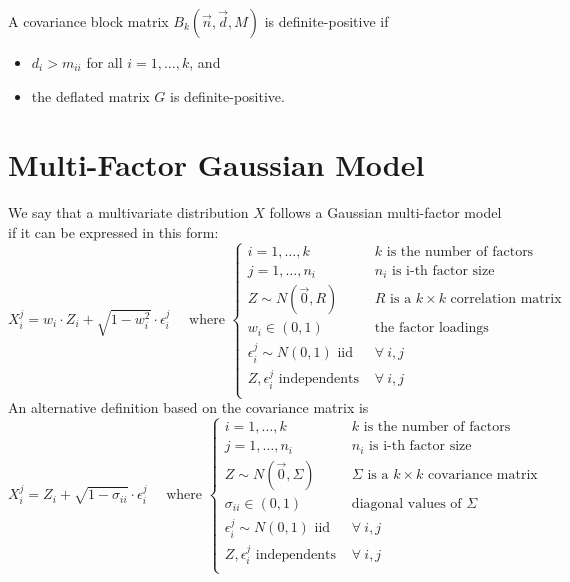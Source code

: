 \documentclass[11pt,fleqn]{book} %
\begin{document}
\begin{corollary}
	A covariance block matrix $B_k(\vec{n},\vec{d},M)$ is definite-positive if
	\begin{itemize}
		\item $d_i > m_{ii}$ for all $i=1,\dots,k$, and
		\item the deflated matrix $G$ is definite-positive.
	\end{itemize}
\end{corollary}

\section{Multi-Factor Gaussian Model}
\label{ap:mfgm}

\begin{definition}
	\label{def:gmfm}
	We say that a multivariate distribution $X$ follows a Gaussian multi-factor
	model if it can be expressed in this form:
	\begin{displaymath}
		X_i^j = w_i \cdot Z_i + \sqrt{1-w_i^2} \cdot \epsilon_i^j
		\quad \text{ where } \left\{
		\begin{array}{ll}
			i = 1, \dots, k & \text{$k$ is the number of factors} \\
			j = 1, \dots, n_i & \text{$n_i$ is i-th factor size} \\
			Z \sim N(\vec{0},R) & \text{$R$ is a $k {\times} k$ correlation matrix} \\
			w_i \in (0,1) & \text{the factor loadings } \\
			\epsilon_i^j \sim N(0,1) \text { iid } & \forall\ i,j \\
			Z, \epsilon_i^j \text{ independents } & \forall\ i,j \\
		\end{array}
		\right.
	\end{displaymath}
	An alternative definition based on the covariance matrix is
	\begin{displaymath}
		X_i^j = Z_i + \sqrt{1-\sigma_{ii}} \cdot \epsilon_i^j
		\quad \text{ where } \left\{
		\begin{array}{ll}
			i = 1, \dots, k & \text{$k$ is the number of factors} \\
			j = 1, \dots, n_i & \text{$n_i$ is i-th factor size} \\
			Z \sim N(\vec{0},\Sigma) & \text{$\Sigma$ is a $k {\times} k$ covariance matrix} \\
			\sigma_{ii} \in (0,1) & \text{diagonal values of $\Sigma$} \\
			\epsilon_i^j \sim N(0,1) \text { iid } & \forall\ i,j \\
			Z, \epsilon_i^j \text{ independents } & \forall\ i,j \\
		\end{array}
		\right.
	\end{displaymath}
\end{definition}
\end{document}
